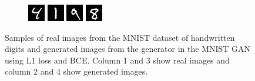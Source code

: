 \documentclass[12pt, fleqn, titlepage]{article}
\newcommand\skipperer{0.45pt}
\newcommand\ripperer{1.25pt}
\newcommand{\1}[1]{\mathds{1}\left[#1\right]}
\begin{document}
\begin{figure}[H]
\begin{subfigure}[b]{0.7\textwidth}
	\end{subfigure}
	\vskip\ripperer
	\begin{subfigure}[b]{0.7\textwidth}
		\centering
		\includegraphics[width=0.22\linewidth]{imgs/MNIST_GAN_normal_real_6}
		\hskip\skipperer
		\includegraphics[width=0.22\linewidth]{imgs/MNIST_GAN_normal_fake_6}
		\hskip\skipperer
		\includegraphics[width=0.22\linewidth]{imgs/MNIST_GAN_normal_real_7}
		\hskip\skipperer
		\includegraphics[width=0.22\linewidth]{imgs/MNIST_GAN_normal_fake_7}
	\end{subfigure}
	\caption{Samples of real images from the MNIST dataset of handwritten digits and generated images from the generator in the MNIST GAN using L1 loss and BCE. Column 1 and 3 show real images and column 2 and 4 show generated images.}
	\label{fig:generated_images_MNIST_GAN_normal}
\end{figure}
\end{document}

